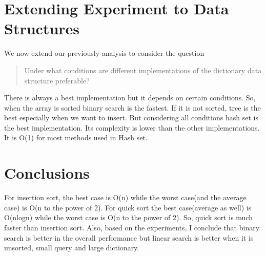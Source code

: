 \documentclass{article}
\begin{document}

\section{Extending Experiment to Data Structures}
\label{sec:part3}

We now extend our previously analysis to consider the question
\begin{quote}
Under what conditions are different implementations of the dictionary data structure preferable?
\end{quote}
There is always a best implementation but it depends on certain conditions. So, when the array is sorted binary search is the fastest. If it is not sorted, tree is the best especially when we want to insert. But considering all conditions hash set is the best implementation. Its complexity is lower than the other implementations. It is O(1) for most methods used in Hash set.
\newpage
\section{Conclusions}
\label{sec:conclusions}
For insertion sort, the best case is O(n) while the worst case(and the average case) is O(n to the power of 2). For quick sort the best case(average as well) is O(nlogn) while the worst case is O(n to the power of 2). So, quick sort is much faster than insertion sort. Also, based on the experiments, I conclude that binary search is better in the overall performance but linear search is better when it is unsorted, small query and large dictionary.
\end{document}
